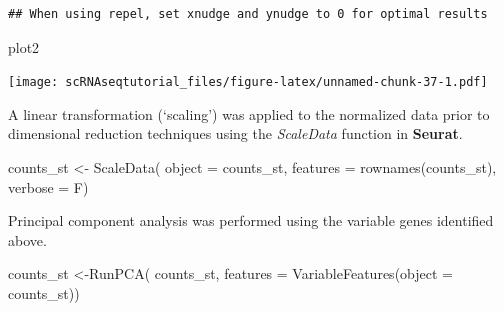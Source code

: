 \documentclass[
  openany]{book}
\newenvironment{Shaded}{\begin{snugshade}}{\end{snugshade}}
\newcommand{\AttributeTok}[1]{\textcolor[rgb]{0.77,0.63,0.00}{#1}}
\newcommand{\FunctionTok}[1]{\textcolor[rgb]{0.00,0.00,0.00}{#1}}
\newcommand{\NormalTok}[1]{#1}
\newcommand{\OtherTok}[1]{\textcolor[rgb]{0.56,0.35,0.01}{#1}}
\begin{document}
\begin{verbatim}
## When using repel, set xnudge and ynudge to 0 for optimal results
\end{verbatim}

\begin{Shaded}
\begin{Highlighting}[]
\NormalTok{plot2}
\end{Highlighting}
\end{Shaded}

\texttt{[image: scRNAseqtutorial\_files/figure-latex/unnamed-chunk-37-1.pdf]}

A linear transformation (`scaling') was applied to the normalized data prior to dimensional reduction techniques using the \emph{ScaleData} function in \textbf{Seurat}.

\begin{Shaded}
\begin{Highlighting}[]
\NormalTok{counts\_st }\OtherTok{\textless{}{-}}  \FunctionTok{ScaleData}\NormalTok{(}
    \AttributeTok{object =}\NormalTok{ counts\_st,}
    \AttributeTok{features =} \FunctionTok{rownames}\NormalTok{(counts\_st),}
    \AttributeTok{verbose =}\NormalTok{ F)}
\end{Highlighting}
\end{Shaded}

Principal component analysis was performed using the variable genes identified above.

\begin{Shaded}
\begin{Highlighting}[]
\NormalTok{counts\_st }\OtherTok{\textless{}{-}}\FunctionTok{RunPCA}\NormalTok{(}
\NormalTok{    counts\_st,}
    \AttributeTok{features =} \FunctionTok{VariableFeatures}\NormalTok{(}\AttributeTok{object =}\NormalTok{ counts\_st))}
\end{Highlighting}
\end{Shaded}
\end{document}
